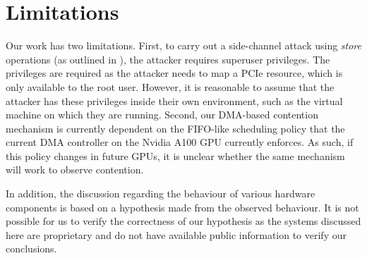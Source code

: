\section{Limitations}
\label{sec:interconnect-sc-limitations}

Our work has two limitations.
First, to carry out a side-channel attack using \textit{store} operations (as outlined in ), the attacker requires superuser privileges.
The privileges are required as the attacker needs to map a PCIe resource, which is only available to the root user.
However, it is reasonable to assume that the attacker has these privileges inside their own environment, such as the virtual machine on which they are running.
Second, our DMA-based contention mechanism is currently dependent on the FIFO-like scheduling policy that the current DMA controller on the Nvidia A100 GPU currently enforces.
As such, if this policy changes in future GPUs, it is unclear whether the same mechanism will work to observe contention.

In addition, the discussion regarding the behaviour of various hardware components is based on a hypothesis made from the observed behaviour.
It is not possible for us to verify the correctness of our hypothesis as the systems discussed here are proprietary and do not have available public information to verify our conclusions.